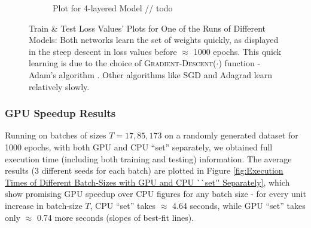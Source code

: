 \documentclass[12pt]{article}
\begin{document}
\begin{figure}[!htbp]
\begin{subfigure}{.49\textwidth}
            \caption{Plot for 4-layered Model // todo}
            \label{fig:Plot for 4-layered Model}
        \end{subfigure}
        \caption[Train \& Test Loss Values' Plots for One of the Runs of Different Models]{Train \& Test Loss Values' Plots for One of the Runs of Different Models: Both networks learn the set of weights quickly, as displayed in the steep descent in loss values before $\approx$ 1000 epochs. This quick learning is due to the choice of \textsc{Gradient-Descent}($\cdot$) function - Adam's algorithm \cite{Adam}. Other algorithms like SGD \cite{SGD} and Adagrad \cite{Adagrad} learn relatively slowly.}
        \label{fig:Train & Test Loss Values' Plots of Different Models}
    \end{figure}

    \subsubsection{GPU Speedup Results} \label{sec:IdProbRes - GPU}
    Running on batches of sizes $T = 17, 85, 173$ on a randomly generated dataset for 1000 epochs, with both GPU and CPU ``set'' separately, we obtained full  execution time (including both training and testing) information. The average results (3 different seeds for each batch) are plotted in Figure \ref{fig:Execution Times of Different Batch-Sizes with GPU and CPU ``set'' Separately}, which show promising GPU speedup over CPU figures for any batch size - for every unit increase in batch-size $T$, CPU ``set'' takes $\approx$ 4.64 seconds, while GPU ``set'' takes only $\approx$ 0.74 more seconds (slopes of best-fit lines).
\end{document}
